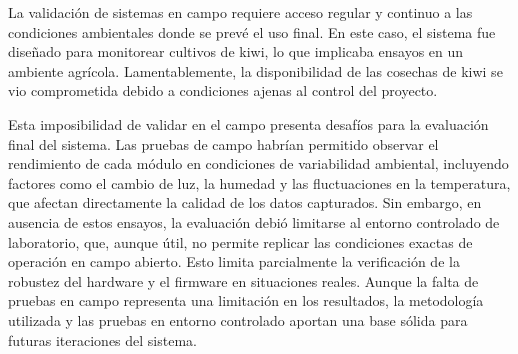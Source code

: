 La validación de sistemas en campo requiere acceso regular y continuo a las condiciones ambientales donde se prevé el uso final. En este caso, el sistema fue diseñado para monitorear cultivos de kiwi, lo que implicaba ensayos en un ambiente agrícola. Lamentablemente, la disponibilidad de las cosechas de kiwi se vio comprometida debido a condiciones ajenas al control del proyecto.

Esta imposibilidad de validar en el campo presenta desafíos para la evaluación final del sistema. Las pruebas de campo habrían permitido observar el rendimiento de cada módulo en condiciones de variabilidad ambiental, incluyendo factores como el cambio de luz, la humedad y las fluctuaciones en la temperatura, que afectan directamente la calidad de los datos capturados. Sin embargo, en ausencia de estos ensayos, la evaluación debió limitarse al entorno controlado de laboratorio, que, aunque útil, no permite replicar las condiciones exactas de operación en campo abierto. Esto limita parcialmente la verificación de la robustez del hardware y el firmware en situaciones reales. Aunque la falta de pruebas en campo representa una limitación en los resultados, la metodología utilizada y las pruebas en entorno controlado aportan una base sólida para futuras iteraciones del sistema.
